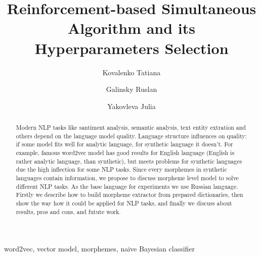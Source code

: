 \documentclass{svproc}
\begin{document}
\mainmatter              %
\title{Reinforcement-based Simultaneous Algorithm and its
Hyperparameters Selection}
%
%
\author{Kovalenko Tatiana\and Galinsky Ruslan \and Yakovleva Julia}
%
%
%
%

\maketitle

\begin{abstract}

Modern NLP tasks like santiment analysis, semantic analysis, text entity extration and others depend on the language model quality. Language structure influences on quality: if some model fits well for analytic language, for synthetic language it doesn't. For example, famous word2vec model has good results for English language (English is rather analytic language, than synthetic), but meets problems for synthetic languages due the high inflection for some NLP tasks. Since every morphemes in synthetic languages contain information, we propose to discuss morpheme level model to solve different NLP tasks. As the base language for experiments we use Russian language. Firstly we describe how to build morpheme extractor from prepared dictionaries, then show the way how it could be applied for NLP tasks, and finally we discuss about results, pros and cons, and futute work.

\end{abstract}
\begin{keywords}
word2vec, vector model, morphemes, naive Bayesian classifier
\end{keywords}
\end{document}
